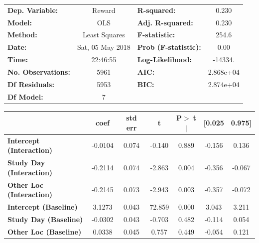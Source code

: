 \begin{table}
\begin{tabular}{lclc}
\toprule
\textbf{Dep. Variable:}                &      Reward       & \textbf{  R-squared:         } &     0.230   \\
\textbf{Model:}                        &       OLS        & \textbf{  Adj. R-squared:    } &     0.230   \\
\textbf{Method:}                       &  Least Squares   & \textbf{  F-statistic:       } &     254.6   \\
\textbf{Date:}                         & Sat, 05 May 2018 & \textbf{  Prob (F-statistic):} &     0.00    \\
\textbf{Time:}                         &     22:46:55     & \textbf{  Log-Likelihood:    } &   -14334.   \\
\textbf{No. Observations:}             &        5961      & \textbf{  AIC:               } & 2.868e+04   \\
\textbf{Df Residuals:}                 &        5953      & \textbf{  BIC:               } & 2.874e+04   \\
\textbf{Df Model:}                     &           7      & \textbf{                     } &             \\
\bottomrule
\end{tabular}
\begin{tabular}{lcccccc}
                                       & \textbf{coef} & \textbf{std err} & \textbf{t} & \textbf{P$>$$|$t$|$} & \textbf{[0.025} & \textbf{0.975]}  \\
\midrule
\textbf{Intercept (Interaction)}       &      -0.0104  &        0.074     &    -0.140  &         0.889        &       -0.156    &        0.136     \\
\textbf{Study Day (Interaction)}       &      -0.2114  &        0.074     &    -2.863  &         0.004        &       -0.356    &       -0.067     \\
\textbf{Other Loc (Interaction)}       &      -0.2145  &        0.073     &    -2.943  &         0.003        &       -0.357    &       -0.072     \\
\textbf{Intercept (Baseline)}          &       3.1273  &        0.043     &    72.859  &         0.000        &        3.043    &        3.211     \\
\textbf{Study Day (Baseline)}          &      -0.0302  &        0.043     &    -0.703  &         0.482        &       -0.114    &        0.054     \\
\textbf{Other Loc (Baseline)}          &       0.0338  &        0.045     &     0.757  &         0.449        &       -0.054    &        0.121     \\

\end{tabular}
\end{table}

